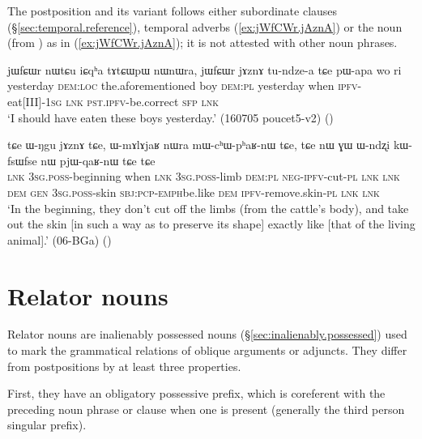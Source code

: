 The postposition  and its variant  follows either subordinate clauses (§\ref{sec:temporal.reference}), temporal adverbs (\ref{ex:jWfCWr.jAznA}) or the noun  (from ) as in (\ref{ex:jWfCWr.jAznA}); it is not attested with other noun phrases.

\begin{exe}
\ex \label{ex:jWfCWr.jAznA}
\gll  jɯfɕɯr nɯtɕu iɕqʰa tɤtɕɯpɯ nɯnɯra, jɯfɕɯr jɤznɤ tu-ndze-a tɕe pɯ-apa wo ri \\ 
yesterday \textsc{dem}:\textsc{loc} the.aforementioned boy \textsc{dem}:\textsc{pl} yesterday when \textsc{ipfv}-eat[III]-\textsc{1sg}  \textsc{lnk} \textsc{pst}.\textsc{ipfv}-be.correct \textsc{sfp} \textsc{lnk} \\
\glt  `I should have eaten these boys yesterday.' (160705 poucet5-v2)
()
\end{exe}

 \begin{exe}
\ex \label{ex:WNgu.jAznA}
\gll  tɕe ɯ-ŋgu jɤznɤ tɕe, ɯ-mɤlɤjaʁ nɯra mɯ-cʰɯ-pʰaʁ-nɯ tɕe,  tɕe nɯ ɣɯ ɯ-ndʐi kɯ-fsɯ\redp{}fse nɯ pjɯ-qaʁ-nɯ tɕe tɕe \\
\textsc{lnk} \textsc{3sg}.\textsc{poss}-beginning when \textsc{lnk} \textsc{3sg}.\textsc{poss}-limb \textsc{dem}:\textsc{pl} \textsc{neg}-\textsc{ipfv}-cut-\textsc{pl} \textsc{lnk} \textsc{lnk} \textsc{dem} \textsc{gen} \textsc{3sg}.\textsc{poss}-skin \textsc{sbj}:\textsc{pcp}-\textsc{emph}\redp{}be.like \textsc{dem} \textsc{ipfv}-remove.skin-\textsc{pl} \textsc{lnk} \textsc{lnk} \\
\glt `In the beginning, they don't cut off the limbs (from the cattle's body), and take out the skin [in such a way as to preserve its shape] exactly like [that of the living animal].' (06-BGa) ()
\end{exe}


 
\section{Relator nouns}  \label{sec:relator.nouns}  
Relator nouns are inalienably possessed nouns (§\ref{sec:inalienably.possessed}) used to mark the grammatical relations of oblique arguments or adjuncts. They differ from postpositions by at least three properties. 

First, they have an obligatory possessive prefix, which is coreferent with the preceding noun phrase or clause when one is present (generally the third person singular  prefix). 

